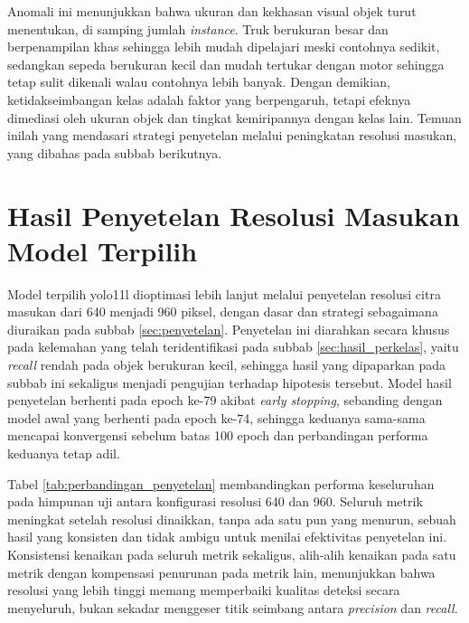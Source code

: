 Anomali ini menunjukkan bahwa ukuran dan kekhasan visual objek turut menentukan, di samping 
jumlah \textit{instance}. Truk berukuran besar dan berpenampilan khas sehingga lebih mudah 
dipelajari meski contohnya sedikit, sedangkan sepeda berukuran kecil dan mudah tertukar 
dengan motor sehingga tetap sulit dikenali walau contohnya lebih banyak. Dengan demikian, 
ketidakseimbangan kelas adalah faktor yang berpengaruh, tetapi efeknya dimediasi oleh ukuran 
objek dan tingkat kemiripannya dengan kelas lain. Temuan inilah yang mendasari strategi 
penyetelan melalui peningkatan resolusi masukan, yang dibahas pada subbab berikutnya.

\section{Hasil Penyetelan Resolusi Masukan Model Terpilih}
\label{sec:hasil_penyetelan}

Model terpilih yolo11l dioptimasi lebih lanjut melalui penyetelan resolusi citra masukan 
dari 640 menjadi 960 piksel, dengan dasar dan strategi sebagaimana diuraikan pada subbab 
\ref{sec:penyetelan}. Penyetelan ini diarahkan secara khusus pada kelemahan yang telah 
teridentifikasi pada subbab \ref{sec:hasil_perkelas}, yaitu \textit{recall} rendah pada 
objek berukuran kecil, sehingga hasil yang dipaparkan pada subbab ini sekaligus menjadi 
pengujian terhadap hipotesis tersebut. Model hasil penyetelan berhenti pada epoch ke-79 
akibat \textit{early stopping}, sebanding dengan model awal yang berhenti pada epoch ke-74, 
sehingga keduanya sama-sama mencapai konvergensi sebelum batas 100 epoch dan perbandingan 
performa keduanya tetap adil.

Tabel \ref{tab:perbandingan_penyetelan} membandingkan performa keseluruhan pada himpunan 
uji antara konfigurasi resolusi 640 dan 960. Seluruh metrik meningkat setelah resolusi 
dinaikkan, tanpa ada satu pun yang menurun, sebuah hasil yang konsisten dan tidak ambigu 
untuk menilai efektivitas penyetelan ini. Konsistensi kenaikan pada seluruh metrik 
sekaligus, alih-alih kenaikan pada satu metrik dengan kompensasi penurunan pada metrik lain, 
menunjukkan bahwa resolusi yang lebih tinggi memang memperbaiki kualitas deteksi secara 
menyeluruh, bukan sekadar menggeser titik seimbang antara \textit{precision} dan 
\textit{recall}.

